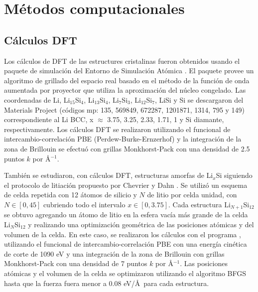 \section{Métodos computacionales}

\subsection{Cálculos DFT}\label{s:dftcalc}

Los cálculos de DFT de las estructures cristalinas fueron obtenidos usando el 
paquete de simulación  \cite{enkovaara2010, mortensen2005} del 
Entorno de Simulación Atómica \cite{larsen2017}. El paquete  provee un 
algoritmo de grillado del espacio real basado en el método de la función de onda 
aumentada por proyector \cite{blochl1994} que utiliza la aproximación del núcleo 
congelado. Las coordenadas de Li, Li$_{15}$Si$_{4}$, Li$_{13}$Si$_{4}$, 
Li$_{7}$Si$_{3}$, Li$_{12}$Si$_{7}$, LiSi y Si se descargaron del Materials 
Project \cite{materials_project} (códigos mp: 135, 569849, 672287, 1201871, 1314, 
795 y 149) correspondiente al Li BCC, x $\approx$ 3.75, 3.25, 2.33, 1.71, 1 y
Si diamante, respectivamente. Los cálculos DFT se realizaron utilizando el 
funcional de intercambio-correlación PBE (Perdew-Burke-Ernzerhof) y la integración
de la zona de Brillouin se efectuó con grillas Monkhorst-Pack con una densidad
de 2.5 puntos $k$ por \AA$^{-1}$.

También se estudiaron, con cálculos DFT, estructuras amorfas de Li$_x$Si siguiendo
el protocolo de litiación propuesto por Chevrier y Dahn \cite{chevrier2009, 
chevrier2010}. Se utilizó un esquema de celda repetida con 12 átomos de silicio y 
$N$ de litio por celda unidad, con $N\in[0,45]$ cubriendo todo el intervalo 
$x\in[0,3.75]$. Cada estructura Li$_{N+1}$Si$_{12}$ se obtuvo agregando un átomo 
de litio en la esfera vacía más grande de la celda Li$_{N}$Si$_{12}$ y realizando
una optimización geométrica de las posiciones atómicas y del volumen de la celda.
En este caso, se realizaron los cálculos con el programa  
 \cite{quantum_espresso,quantum_espresso_advanced}, utilizando el 
funcional de intercambio-correlación PBE con una energía cinética de corte de 
1090 eV y una integración de la zona de Brillouin con grillas Monkhorst-Pack con 
una densidad de 7 puntos $k$ por \AA$^{-1}$. Las posiciones atómicas y el volumen 
de la celda se optimizaron utilizando el algoritmo BFGS hasta que la fuerza fuera 
menor a 0.08 eV/\AA\ para cada estructura.



